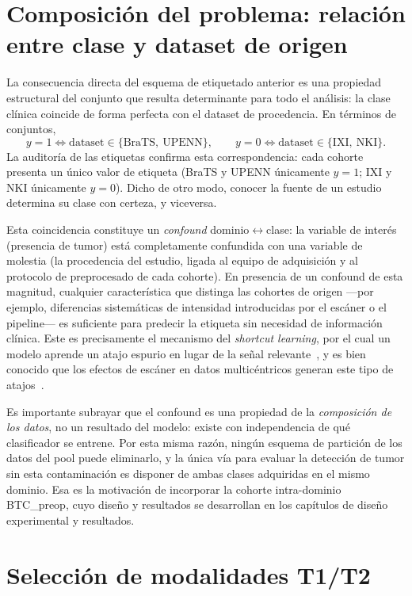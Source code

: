 \section{Composición del problema: relación entre clase y dataset de origen}
\label{sec:confound}

La consecuencia directa del esquema de etiquetado anterior es una propiedad
estructural del conjunto que resulta determinante para todo el análisis: la
clase clínica coincide de forma perfecta con el dataset de procedencia. En
términos de conjuntos,
\[
  y = 1 \iff \text{dataset} \in \{\text{BraTS},\ \text{UPENN}\},
  \qquad
  y = 0 \iff \text{dataset} \in \{\text{IXI},\ \text{NKI}\}.
\]
La auditoría de las etiquetas confirma esta correspondencia: cada cohorte
presenta un único valor de etiqueta (BraTS y UPENN únicamente $y=1$; IXI y NKI
únicamente $y=0$). Dicho de otro modo, conocer la fuente de un estudio
determina su clase con certeza, y viceversa.

Esta coincidencia constituye un \emph{confound} dominio$\leftrightarrow$clase: la variable de
interés (presencia de tumor) está completamente confundida con una variable de
molestia (la procedencia del estudio, ligada al equipo de adquisición y al
protocolo de preprocesado de cada cohorte). En presencia de un confound de esta
magnitud, cualquier característica que distinga las cohortes de origen ---por
ejemplo, diferencias sistemáticas de intensidad introducidas por el escáner o
el pipeline--- es suficiente para predecir la etiqueta sin necesidad de
información clínica. Este es precisamente el mecanismo del \emph{shortcut
learning}, por el cual un modelo aprende un atajo espurio en lugar de la señal
relevante~\cite{geirhos2020shortcut}, y es bien conocido que los efectos de
escáner en datos multicéntricos generan este tipo de
atajos~\cite{glocker2019scanner,castro2020causality}.

Es importante subrayar que el confound es una propiedad de la \emph{composición
de los datos}, no un resultado del modelo: existe con independencia de qué
clasificador se entrene. Por esta misma razón, ningún esquema de partición de
los datos del pool puede eliminarlo, y la única vía para evaluar la detección de
tumor sin esta contaminación es disponer de ambas clases adquiridas en el mismo
dominio. Esa es la motivación de incorporar la cohorte intra-dominio BTC\_preop,
cuyo diseño y resultados se desarrollan en los capítulos de diseño experimental
y resultados.

\section{Selección de modalidades T1/T2}
\label{sec:modalidades}

